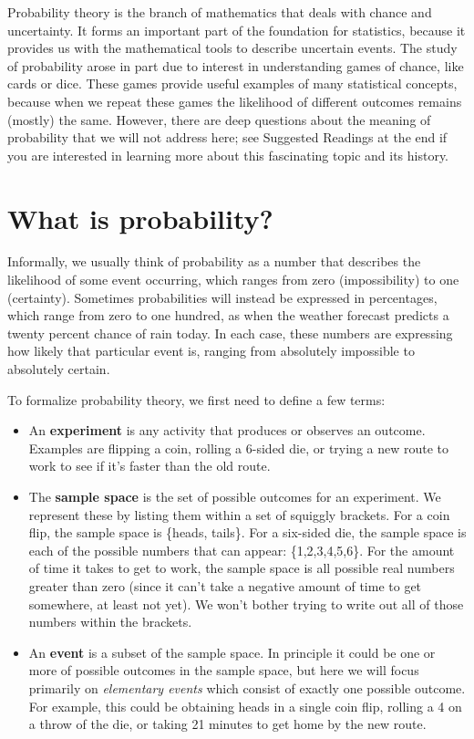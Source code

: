 \documentclass[
  12pt,
]{book}
\providecommand{\tightlist}{%
  \setlength{\itemsep}{0pt}\setlength{\parskip}{0pt}}
\begin{document}
Probability theory is the branch of mathematics that deals with chance and uncertainty. It forms an important part of the foundation for statistics, because it provides us with the mathematical tools to describe uncertain events. The study of probability arose in part due to interest in understanding games of chance, like cards or dice. These games provide useful examples of many statistical concepts, because when we repeat these games the likelihood of different outcomes remains (mostly) the same. However, there are deep questions about the meaning of probability that we will not address here; see Suggested Readings at the end if you are interested in learning more about this fascinating topic and its history.

\hypertarget{what-is-probability}{%
\section{What is probability?}\label{what-is-probability}}

Informally, we usually think of probability as a number that describes the likelihood of some event occurring, which ranges from zero (impossibility) to one (certainty). Sometimes probabilities will instead be expressed in percentages, which range from zero to one hundred, as when the weather forecast predicts a twenty percent chance of rain today. In each case, these numbers are expressing how likely that particular event is, ranging from absolutely impossible to absolutely certain.

To formalize probability theory, we first need to define a few terms:

\begin{itemize}
\tightlist
\item
  An \textbf{experiment} is any activity that produces or observes an outcome. Examples are flipping a coin, rolling a 6-sided die, or trying a new route to work to see if it's faster than the old route.
\item
  The \textbf{sample space} is the set of possible outcomes for an experiment. We represent these by listing them within a set of squiggly brackets. For a coin flip, the sample space is \{heads, tails\}. For a six-sided die, the sample space is each of the possible numbers that can appear: \{1,2,3,4,5,6\}. For the amount of time it takes to get to work, the sample space is all possible real numbers greater than zero (since it can't take a negative amount of time to get somewhere, at least not yet). We won't bother trying to write out all of those numbers within the brackets.
\item
  An \textbf{event} is a subset of the sample space. In principle it could be one or more of possible outcomes in the sample space, but here we will focus primarily on \emph{elementary events} which consist of exactly one possible outcome. For example, this could be obtaining heads in a single coin flip, rolling a 4 on a throw of the die, or taking 21 minutes to get home by the new route.
\end{itemize}
\end{document}
